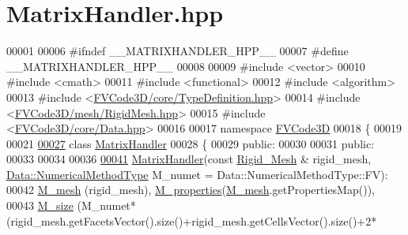 \hypertarget{MatrixHandler_8hpp_source}{}\section{Matrix\+Handler.\+hpp}
\label{MatrixHandler_8hpp_source}

\begin{DoxyCode}
00001 
00006 \textcolor{preprocessor}{#ifndef \_\_MATRIXHANDLER\_HPP\_\_}
00007 \textcolor{preprocessor}{#define \_\_MATRIXHANDLER\_HPP\_\_}
00008 
00009 \textcolor{preprocessor}{#include <vector>}
00010 \textcolor{preprocessor}{#include <cmath>}
00011 \textcolor{preprocessor}{#include <functional>}
00012 \textcolor{preprocessor}{#include <algorithm>}
00013 \textcolor{preprocessor}{#include <\hyperlink{TypeDefinition_8hpp}{FVCode3D/core/TypeDefinition.hpp}>}
00014 \textcolor{preprocessor}{#include <\hyperlink{RigidMesh_8hpp}{FVCode3D/mesh/RigidMesh.hpp}>}
00015 \textcolor{preprocessor}{#include <\hyperlink{Data_8hpp}{FVCode3D/core/Data.hpp}>}
00016 
00017 \textcolor{keyword}{namespace }\hyperlink{namespaceFVCode3D}{FVCode3D}
00018 \{
00019 
00021 
\hypertarget{MatrixHandler_8hpp_source.tex_l00027}{}\hyperlink{classFVCode3D_1_1MatrixHandler}{00027} \textcolor{keyword}{class }\hyperlink{classFVCode3D_1_1MatrixHandler}{MatrixHandler}
00028 \{
00029 \textcolor{keyword}{public}:
00030 
00031 \textcolor{keyword}{public}:
00033 
00034 
00036 
\hypertarget{MatrixHandler_8hpp_source.tex_l00041}{}\hyperlink{classFVCode3D_1_1MatrixHandler_a74e467c61446d6172111f2ecff45af99}{00041}     \hyperlink{classFVCode3D_1_1MatrixHandler_a74e467c61446d6172111f2ecff45af99}{MatrixHandler}(\textcolor{keyword}{const} \hyperlink{classFVCode3D_1_1Rigid__Mesh}{Rigid\_Mesh} & rigid\_mesh, 
      \hyperlink{classFVCode3D_1_1Data_a5222e1901276af4586befd821445c6cf}{Data::NumericalMethodType} M\_numet = Data::NumericalMethodType::FV):
00042         \hyperlink{classFVCode3D_1_1MatrixHandler_a72f185cb557fc2e8023bd09a074f685c}{M\_mesh} (rigid\_mesh), \hyperlink{classFVCode3D_1_1MatrixHandler_ad17a7941b1b8272f50fc6e1c660103fa}{M\_properties}(\hyperlink{classFVCode3D_1_1MatrixHandler_a72f185cb557fc2e8023bd09a074f685c}{M\_mesh}.getPropertiesMap()),
00043         \hyperlink{classFVCode3D_1_1MatrixHandler_a0162a412f52cf9a540ea359e6a5c9a6f}{M\_size} (M\_numet*(rigid\_mesh.getFacetsVector().size()+rigid\_mesh.getCellsVector().size()+2*

\end{DoxyCode}
